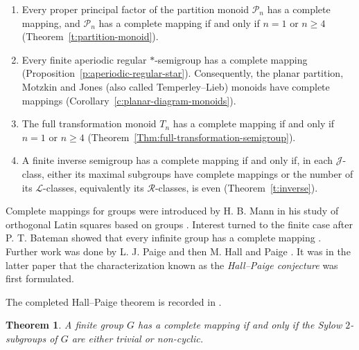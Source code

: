 \documentclass[11pt]{article}
\theoremstyle{plain}
\newtheorem{theorem}{Theorem}[section]
\theoremstyle{remark}
\theoremstyle{definition}
\theoremstyle{plain}
\begin{document}
\begin{enumerate}
\item Every proper principal factor of the partition monoid $\mathcal P_n$
has a complete mapping, and $\mathcal P_n$ has a complete mapping if and only
if $n=1$ or $n\ge4$ (Theorem~\ref{t:partition-monoid}).

\item Every finite aperiodic regular $*$-semigroup has a complete mapping
(Proposition~\ref{p:aperiodic-regular-star}). Consequently, the planar
partition, Motzkin and Jones (also called Temperley--Lieb) monoids have complete mappings
(Corollary~\ref{c:planar-diagram-monoids}).

\item The full transformation monoid $T_n$ has a complete mapping if and only
if $n=1$ or $n\ge4$ (Theorem~\ref{Thm:full-transformation-semigroup}).

\item A finite inverse semigroup has a complete mapping if and only if, in
each $\mathcal J$-class, either its maximal subgroups have complete mappings
or the number of its $\mathcal L$-classes, equivalently its
$\mathcal R$-classes, is even (Theorem~\ref{t:inverse}).
\end{enumerate}
\endgroup



{Complete mappings for groups were introduced by H. B. Mann in his study of orthogonal Latin squares based on groups \cite{Mann1,Mann2}. Interest turned to the finite case after P. T. Bateman showed that every infinite group has a complete mapping \cite[Theorem]{Bateman}. Further work was done by L. J. Paige \cite{Paige} and then M. Hall and Paige \cite{hp}. It was in the latter paper that the characterization known as the \emph{Hall--Paige conjecture} was first formulated.}

{The completed Hall--Paige theorem is recorded in
\cite[Theorems~5 and~6]{evans4}.}

\begin{theorem}\label{Thm:HP}
A finite group $G$ has a complete mapping if and only if the Sylow $2$-subgroups of $G$ are either trivial or non-cyclic.
\end{theorem}
\end{document}
